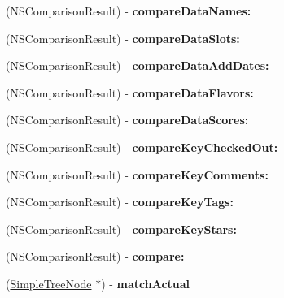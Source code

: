 \begin{DoxyCompactItemize}
\item 
\hypertarget{interface_simple_node_data_ab7f3f909005bd52566d18ec7bd0bcbc1}{
(NSComparisonResult) -\/ {\bfseries compareDataNames:}}
\label{interface_simple_node_data_ab7f3f909005bd52566d18ec7bd0bcbc1}

\item 
\hypertarget{interface_simple_node_data_a1767d620577f5d52ff659e4172bce3cf}{
(NSComparisonResult) -\/ {\bfseries compareDataSlots:}}
\label{interface_simple_node_data_a1767d620577f5d52ff659e4172bce3cf}

\item 
\hypertarget{interface_simple_node_data_a2bea5cc795b4894ff0373eb627885e74}{
(NSComparisonResult) -\/ {\bfseries compareDataAddDates:}}
\label{interface_simple_node_data_a2bea5cc795b4894ff0373eb627885e74}

\item 
\hypertarget{interface_simple_node_data_a20db640e8ea9fe5d7bf539e4090ac466}{
(NSComparisonResult) -\/ {\bfseries compareDataFlavors:}}
\label{interface_simple_node_data_a20db640e8ea9fe5d7bf539e4090ac466}

\item 
\hypertarget{interface_simple_node_data_a52c303487f5e21cd4c0273bf21871f7c}{
(NSComparisonResult) -\/ {\bfseries compareDataScores:}}
\label{interface_simple_node_data_a52c303487f5e21cd4c0273bf21871f7c}

\item 
\hypertarget{interface_simple_node_data_a170d0ec3cb679b3fb1999e38e2236302}{
(NSComparisonResult) -\/ {\bfseries compareKeyCheckedOut:}}
\label{interface_simple_node_data_a170d0ec3cb679b3fb1999e38e2236302}

\item 
\hypertarget{interface_simple_node_data_ae6521fd09bc63cb72b5d4d3695d75d1c}{
(NSComparisonResult) -\/ {\bfseries compareKeyComments:}}
\label{interface_simple_node_data_ae6521fd09bc63cb72b5d4d3695d75d1c}

\item 
\hypertarget{interface_simple_node_data_a18a82c2c7e75cf7546bc41fec01a8116}{
(NSComparisonResult) -\/ {\bfseries compareKeyTags:}}
\label{interface_simple_node_data_a18a82c2c7e75cf7546bc41fec01a8116}

\item 
\hypertarget{interface_simple_node_data_ad9efd8536c19dfc0e079d8331577f824}{
(NSComparisonResult) -\/ {\bfseries compareKeyStars:}}
\label{interface_simple_node_data_ad9efd8536c19dfc0e079d8331577f824}

\item 
\hypertarget{interface_simple_node_data_a582dda970caef52d82695d3d5f113e13}{
(NSComparisonResult) -\/ {\bfseries compare:}}
\label{interface_simple_node_data_a582dda970caef52d82695d3d5f113e13}

\item 
\hypertarget{interface_simple_node_data_ad35320f67168e534b22b9d958df4453f}{
(\hyperlink{class_simple_tree_node}{SimpleTreeNode} $\ast$) -\/ {\bfseries matchActual}}
\label{interface_simple_node_data_ad35320f67168e534b22b9d958df4453f}

\end{DoxyCompactItemize}
